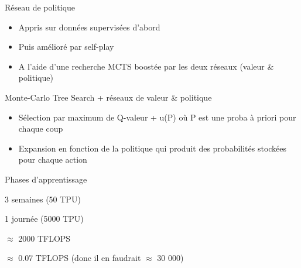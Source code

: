 \begin{frame}{Réseau de politique}
  \begin{minipage}[c]{0.50\linewidth}
  \end{minipage}\hfill
  \begin{minipage}[c]{0.49\linewidth}
    \begin{itemize}[<+->]
      \item Appris sur données supervisées d'abord
      \item Puis amélioré par self-play
      \item A l'aide d'une recherche MCTS boostée par les deux réseaux (valeur \& politique)
    \end{itemize}
  \end{minipage}\hfill
\end{frame}

\begin{frame}{Monte-Carlo Tree Search + réseaux de valeur \& politique}
  \begin{itemize}[<+->]
    \item Sélection par maximum de Q-valeur + u(P) où P est une proba à priori pour chaque coup
    \item Expansion en fonction de la politique qui produit des probabilités stockées pour chaque action
  \end{itemize}
\end{frame}

\begin{frame}{Phases d'apprentissage}
  \begin{description}[<+->]
    \item[Supervisé] 3 semaines (50 TPU) 
    \item[Renforcement] 1 journée (5000 TPU)
  \end{description}


  \begin{description}[<+->]
    \item[50 TPU] $\approx$ 2000 TFLOPS
    \item[Core i7] $\approx$ 0.07 TFLOPS (donc il en faudrait $\approx$ 30 000)
  \end{description}
\end{frame}

